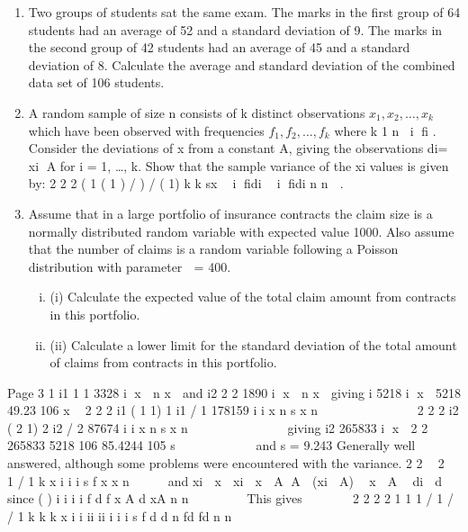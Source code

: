 \documentclass[a4paper,12pt]{article}
\begin{document}
\begin{enumerate}

\item 
Two groups of students sat the same exam. The marks in the first group of 64 students had an average of 52 and a standard deviation of 9. The marks in the second group of 42 students had an average of 45 and a standard deviation of 8.
Calculate the average and standard deviation of the combined data set of 106 students.

\item 
A random sample of size n consists of k distinct observations $x_1, x_2, \ldots, x_k$ which have
been observed with frequencies $f_1, f_2, \ldots, f_k$ where k 1
n i fi . Consider the
deviations of x from a constant A, giving the observations di= xi A for i = 1, …, k.
Show that the sample variance of the xi values is given by:
  2 2 2
( 1 ( 1 ) / ) / ( 1) k k
sx  i fidi  i fidi n n  .

\item 
Assume that in a large portfolio of insurance contracts the claim size is a normally distributed random variable with expected value 1000. Also assume that the number of claims is a random variable following a Poisson distribution with parameter
 = 400.

\begin{enumerate}[(i)]
\item (i) Calculate the expected value of the total claim amount from contracts in this portfolio. 
\item (ii) Calculate a lower limit for the standard deviation of the total amount of claims from contracts in this portfolio. 
\end{enumerate}
\end{enumerate}
\newpage

Page 3
1 i1 1 1 3328
i
x  n x  and i2 2 2 1890
i
x  n x  giving i 5218
i
x 
5218 49.23
106
x 
2
2 2
i1 ( 1 1) 1 i1 / 1 178159
i i
x n s x n
 
    
 
 
2
2 2
i2 ( 2 1) 2 i2 / 2 87674
i i
x n s x n
 
    
 
  giving i2 265833
i
x 
2
2
265833 5218
106
85.4244
105
s
 
  
    and s = 9.243
Generally well answered, although some problems were encountered with the variance.
2 2  2  
1
/ 1
k
x i i
i
s f x x n

  
and xi  x  xi  x  A A  (xi  A)  x  A  di  d
since
( )
i i i i f d f x A
d xA
n n

     
This gives      
2
2 2 2
1 1 1
/ 1 / / 1
k k k
x i i ii ii
i i i
s f d d n fd fd n n
  
                    
  
\newpage
\end{document}

